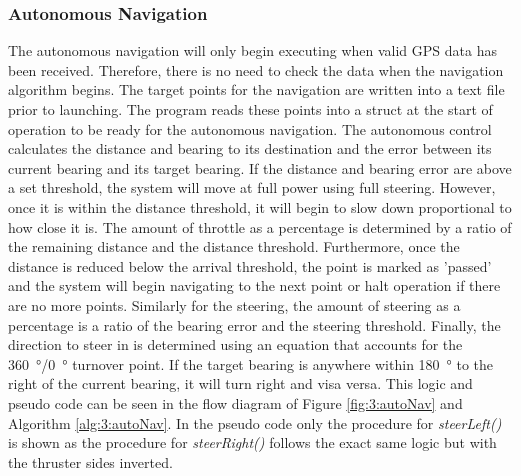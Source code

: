 \subsubsection{Autonomous Navigation}
The autonomous navigation will only begin executing when valid GPS data has been received. Therefore, there is no need to check the data when the navigation algorithm begins. The target points for the navigation are written into a text file prior to launching. The program reads these points into a struct at the start of operation to be ready for the autonomous navigation. The autonomous control calculates the distance and bearing to its destination and the error between its current bearing and its target bearing. If the distance and bearing error are above a set threshold, the system will move at full power using full steering. However, once it is within the distance threshold, it will begin to slow down proportional to how close it is. The amount of throttle as a percentage is determined by a ratio of the remaining distance and the distance threshold. Furthermore, once the distance is reduced below the arrival threshold, the point is marked as 'passed' and the system will begin navigating to the next point or halt operation if there are no more points. Similarly for the steering, the amount of steering as a percentage is a ratio of the bearing error and the steering threshold. Finally, the direction to steer in is determined using an equation that accounts for the \SI{360}{\degree}/\SI{0}{\degree} turnover point. If the target bearing is anywhere within \SI{180}{\degree} to the right of the current bearing, it will turn right and visa versa. This logic and pseudo code can be seen in the flow diagram of Figure \ref{fig:3:autoNav} and Algorithm \ref{alg:3:autoNav}. In the pseudo code only the procedure for \emph{steerLeft()} is shown as the procedure for \emph{steerRight()} follows the exact same logic but with the thruster sides inverted. 
